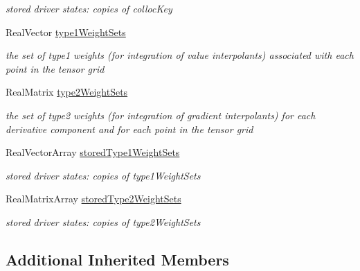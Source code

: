 \begin{DoxyCompactItemize}
\begin{DoxyCompactList}\small\item\em stored driver states\+: copies of colloc\+Key \end{DoxyCompactList}\item 
Real\+Vector \hyperlink{classPecos_1_1TensorProductDriver_a5f380207cc4a07db88fe31b3a88b6029}{type1\+Weight\+Sets}\label{classPecos_1_1TensorProductDriver_a5f380207cc4a07db88fe31b3a88b6029}

\begin{DoxyCompactList}\small\item\em the set of type1 weights (for integration of value interpolants) associated with each point in the tensor grid \end{DoxyCompactList}\item 
Real\+Matrix \hyperlink{classPecos_1_1TensorProductDriver_a30698bb53a106db16591ea9d4cda6bf5}{type2\+Weight\+Sets}\label{classPecos_1_1TensorProductDriver_a30698bb53a106db16591ea9d4cda6bf5}

\begin{DoxyCompactList}\small\item\em the set of type2 weights (for integration of gradient interpolants) for each derivative component and for each point in the tensor grid \end{DoxyCompactList}\item 
Real\+Vector\+Array \hyperlink{classPecos_1_1TensorProductDriver_a2156536b40c41239c3a68b7e13cbc318}{stored\+Type1\+Weight\+Sets}\label{classPecos_1_1TensorProductDriver_a2156536b40c41239c3a68b7e13cbc318}

\begin{DoxyCompactList}\small\item\em stored driver states\+: copies of type1\+Weight\+Sets \end{DoxyCompactList}\item 
Real\+Matrix\+Array \hyperlink{classPecos_1_1TensorProductDriver_a09205b80e2cad1bcf686460ebd1597b2}{stored\+Type2\+Weight\+Sets}\label{classPecos_1_1TensorProductDriver_a09205b80e2cad1bcf686460ebd1597b2}

\begin{DoxyCompactList}\small\item\em stored driver states\+: copies of type2\+Weight\+Sets \end{DoxyCompactList}\end{DoxyCompactItemize}
\subsection*{Additional Inherited Members}


